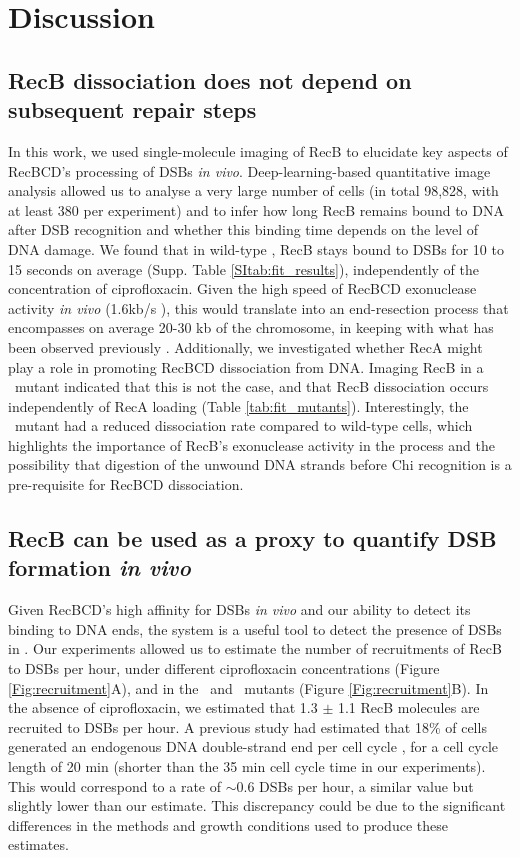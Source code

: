 \section*{Discussion}

\subsection*{RecB dissociation does not depend on subsequent repair steps}
In this work, we used single-molecule imaging of RecB to elucidate key aspects of RecBCD's processing of DSBs \emph{in vivo}. Deep-learning-based quantitative image analysis allowed us to analyse a very large number of cells (in total 98,828, with at least 380 per experiment) and to infer how long RecB remains bound to DNA after DSB recognition and whether this binding time depends on the level of DNA damage. We found that in wild-type \ecoli, RecB stays bound to DSBs for 10 to 15 seconds on average (Supp. Table \ref{SItab:fit_results}), independently of the concentration of ciprofloxacin. Given the high speed of RecBCD exonuclease activity \emph{in vivo} (1.6kb/s \cite{Wiktor2018}), this would translate into an end-resection process that encompasses on average 20-30 kb of the chromosome, in keeping with what has been observed previously \cite{Cockram2015, Wiktor2018}. Additionally, we investigated whether RecA might play a role in promoting RecBCD dissociation from DNA. Imaging RecB in a \dreca\ mutant indicated that this is not the case, and that RecB dissociation occurs independently of RecA loading (Table \ref{tab:fit_mutants}). Interestingly, the \geneteneighty\ mutant had a reduced dissociation rate compared to wild-type cells, which highlights the importance of RecB's exonuclease activity in the process and the possibility that digestion of the unwound DNA strands before Chi recognition is a pre-requisite for RecBCD dissociation.

\subsection*{RecB can be used as a proxy to quantify DSB formation \emph{in vivo}}
Given RecBCD's high affinity for DSBs \emph{in vivo} and our ability to detect its binding to DNA ends, the system is a useful tool to detect the presence of DSBs in \ecoli. Our experiments allowed us to estimate the number of recruitments of RecB to DSBs per hour, under different ciprofloxacin concentrations (Figure \ref{Fig:recruitment}A), and in the \dreca\ and \geneteneighty\ mutants (Figure \ref{Fig:recruitment}B). In the absence of ciprofloxacin, we estimated that 1.3 $\pm$ 1.1 RecB molecules are recruited to DSBs per hour. A previous study had estimated that 18\% of cells generated an endogenous DNA double-strand end per cell cycle \cite{Sinha2018}, for a cell cycle length of 20 min (shorter than the 35 min cell cycle time in our experiments). This would correspond to a rate of $\sim$0.6 DSBs per hour, a similar value but slightly lower than our estimate. This discrepancy could be due to the significant differences in the methods and growth conditions used to produce these estimates.

